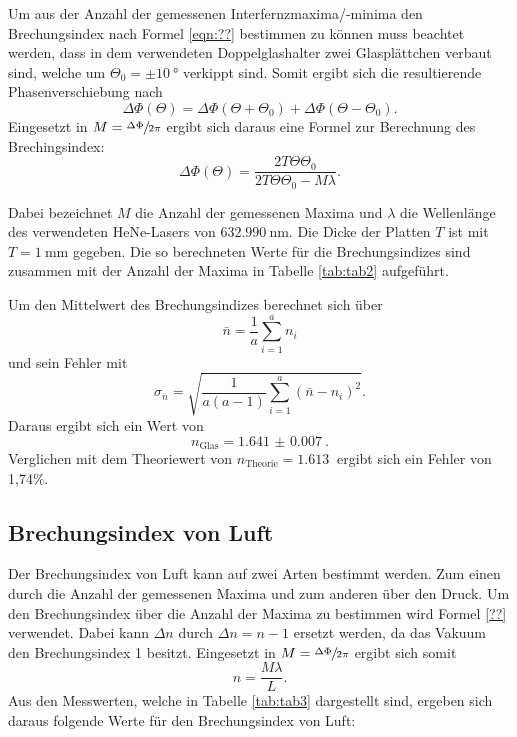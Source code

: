 Um aus der Anzahl der gemessenen Interfernzmaxima/-minima den Brechungsindex nach Formel \ref{eqn:??}
bestimmen zu können muss beachtet werden, dass in dem verwendeten Doppelglashalter zwei Glasplättchen verbaut sind,
welche um $\Theta_0=\pm\SI{10}{\degree}$ verkippt sind. Somit ergibt sich die resultierende
Phasenverschiebung nach
\begin{equation}
  \Delta\Phi(\Theta)=\Delta\Phi(\Theta+\Theta_0)+\Delta\Phi(\Theta-\Theta_0).
\end{equation}
Eingesetzt in $M=\sfrac{\Delta\Phi}{2\pi}$ ergibt sich daraus eine Formel zur Berechnung des Brechingsindex:
\begin{equation}
  \Delta\Phi(\Theta)=\frac{2T\Theta\Theta_0}{2T\Theta\Theta_0-M\lambda}.
\end{equation}

Dabei bezeichnet $M$ die Anzahl der gemessenen Maxima und $\lambda$ die Wellenlänge des
verwendeten HeNe-Lasers von $\SI{632,990}{\nm}$. Die Dicke der Platten $T$ ist mit
$T=\SI{1}{\mm}$ gegeben. Die so berechneten Werte für die Brechungsindizes sind zusammen mit
der Anzahl der Maxima in Tabelle \ref{tab:tab2} aufgeführt.



Um den Mittelwert des Brechungsindizes berechnet sich über
\begin{equation}
  \bar{n}=\frac{1}{a}\sum_{i=1}^{a}n_i
  \label{eqn:Mittel}
\end{equation}
und sein Fehler mit
\begin{equation}
  \sigma_{\bar{n}}=\sqrt{\frac{1}{a(a-1)}\sum_{i=1}^{a}(\bar{n}-n_i)^2}.
  \label{eqn:Fehler}
\end{equation}
Daraus ergibt sich ein Wert von
\begin{equation}
  n_\text{Glas}=\SI{1.641(7)}{}.
\end{equation}
Verglichen mit dem Theoriewert von $n_\text{Theorie}=\SI{1,613}{}$ ergibt sich ein Fehler von 1,74\%.

\subsection{Brechungsindex von Luft}

Der Brechungsindex von Luft kann auf zwei Arten bestimmt werden. Zum einen durch die Anzahl der
gemessenen Maxima und zum anderen über den Druck.
Um den Brechungsindex über die Anzahl der Maxima zu bestimmen wird Formel \ref{??}
verwendet. Dabei kann $\Delta n$ durch  $\Delta n= n-1$ ersetzt werden, da das Vakuum den
Brechungsindex 1 besitzt. Eingesetzt in $M=\sfrac{\Delta\Phi}{2\pi}$ ergibt sich somit
\begin{equation}
  n=\frac{M\lambda}{L}.
\end{equation}
Aus den Messwerten, welche in Tabelle \ref{tab:tab3} dargestellt sind, ergeben sich daraus folgende Werte für
den Brechungsindex von Luft:

